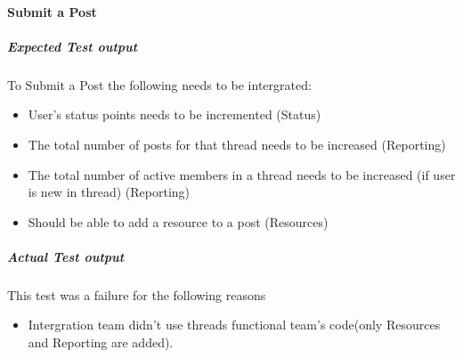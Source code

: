 \paragraph{Submit a Post}
	\subparagraph{Expected Test output}
	To Submit a Post the following needs to be intergrated:
		\begin{itemize}
			\item User's status points needs to be incremented (Status)
			\item The total number of posts for that thread needs to be increased (Reporting)
			\item The total number of active members in a thread needs to be increased (if user is new in thread) (Reporting)
			\item Should be able to add a resource to a post (Resources)
		\end{itemize}
	
	\subparagraph{Actual Test output}
	This test was a failure for the following reasons
		\begin{itemize}
			\item Intergration team didn't use threads functional team's code(only Resources and Reporting are added).
		\end{itemize}
